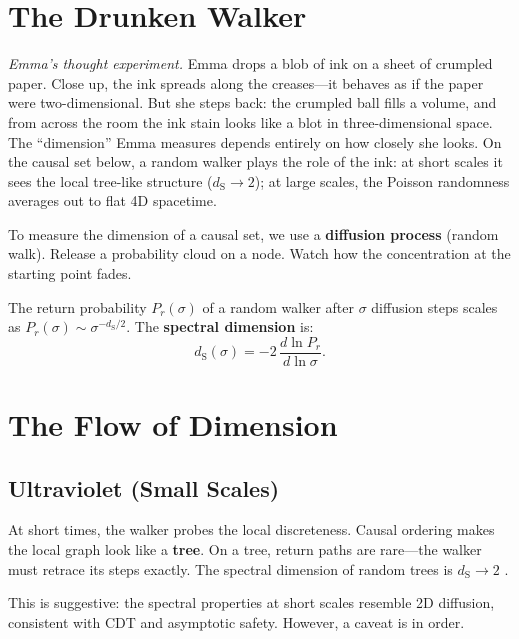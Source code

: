 \documentclass[11pt, a4paper, openany]{book}
\newcommand{\dS}{d_{\mathrm{S}}}
\newcommand{\KC}[1]{\textnormal{(\textsc{kc}~#1)}}
\begin{document}
\section{The Drunken Walker}

\smallskip\noindent
\textit{Emma's thought experiment.}
Emma drops a blob of ink on a sheet of crumpled paper. Close up, the ink
spreads along the creases---it behaves as if the paper were
two-dimensional. But she steps back: the crumpled ball fills a volume,
and from across the room the ink stain looks like a blot in
three-dimensional space. The ``dimension'' Emma measures depends entirely
on how closely she looks. On the causal set below, a random walker plays
the role of the ink: at short scales it sees the local tree-like
structure ($\dS \to 2$); at large scales, the Poisson randomness
averages out to flat 4D spacetime.
\smallskip

\noindent
To measure the dimension of a causal set, we use a \textbf{diffusion
process} (random walk). Release a probability cloud on a node. Watch how
the concentration at the starting point fades.

\begin{definition}[Spectral Dimension \KC{Def.~3.2}]\label{def:spectral-dim}
The return probability $P_r(\sigma)$ of a random walker after $\sigma$
diffusion steps scales as $P_r(\sigma) \sim \sigma^{-\dS/2}$. The
\textbf{spectral dimension} is:
\begin{equation}
  \dS(\sigma) = -2\,\frac{d\ln P_r}{d\ln\sigma}.
\end{equation}
\end{definition}

\section{The Flow of Dimension}

\subsection{Ultraviolet (Small Scales)}

At short times, the walker probes the local discreteness. Causal
ordering makes the local graph look like a \textbf{tree}. On a tree,
return paths are rare---the walker must retrace its steps exactly. The
spectral dimension of random trees is $\dS \to 2$
\cite{eichhorn2014,carlip2017}.

This is suggestive: the spectral properties at short scales
resemble 2D diffusion, consistent with CDT and asymptotic safety.
However, a caveat is in order.
\end{document}
